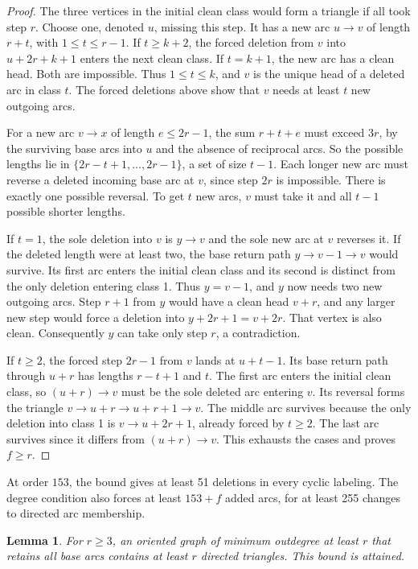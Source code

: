 \documentclass[10pt]{article}
\newtheorem{lemma}[theorem]{Lemma}
\begin{document}
\begin{proof}
The three vertices in the initial clean class would form a triangle
if all took step \(r\). Choose one, denoted \(u\), missing this step.
It has a new arc \(u\to v\) of length \(r+t\), with \(1\le t\le r-1\).
If \(t\ge k+2\), the forced deletion from \(v\) into \(u+2r+k+1\)
enters the next clean class. If \(t=k+1\), the new arc has a clean
head. Both are impossible. Thus \(1\le t\le k\), and \(v\) is the
unique head of a deleted arc in class \(t\). The forced deletions
above show that \(v\) needs at least \(t\) new outgoing arcs.

For a new arc \(v\to x\) of length \(e\le2r-1\), the sum \(r+t+e\)
must exceed \(3r\), by the surviving base arcs into \(u\) and the
absence of reciprocal arcs. So the possible lengths lie in
\(\{2r-t+1,\ldots,2r-1\}\), a set of size \(t-1\).
Each longer new arc must reverse a deleted incoming base arc at \(v\),
since step \(2r\) is impossible. There is exactly one possible
reversal. To get \(t\) new arcs, \(v\) must take it and all \(t-1\)
possible shorter lengths.

If \(t=1\), the sole deletion into \(v\) is \(y\to v\) and the sole new
arc at \(v\) reverses it. If the deleted length were at least two,
the base return path \(y\to v-1\to v\) would survive. Its first arc
enters the initial clean class and its second is distinct from the
only deletion entering class 1. Thus \(y=v-1\), and \(y\) now needs
two new outgoing arcs. Step \(r+1\) from \(y\) would have a clean
head \(v+r\), and any larger new step would force a deletion into
\(y+2r+1=v+2r\). That vertex is also clean. Consequently \(y\) can
take only step \(r\), a contradiction.

If \(t\ge2\), the forced step \(2r-1\) from \(v\) lands at \(u+t-1\).
Its base return path through \(u+r\) has lengths \(r-t+1\) and \(t\).
The first arc enters the initial clean class, so \((u+r)\to v\)
must be the sole deleted arc entering \(v\). Its reversal forms the
triangle \(v\to u+r\to u+r+1\to v\). The middle arc survives because
the only deletion into class 1 is \(v\to u+2r+1\), already forced by
\(t\ge2\). The last arc survives since it differs from \((u+r)\to v\).
This exhausts the cases and proves \(f\ge r\).
\end{proof}

At order \(153\), the bound gives at least 51 deletions in every cyclic
labeling. The degree condition also forces at least \(153+f\) added
arcs, for at least 255 changes to directed arc membership.

\begin{lemma}
For \(r\ge3\), an oriented graph of minimum outdegree at least \(r\)
that retains all base arcs contains at least \(r\) directed triangles.
This bound is attained.
\end{lemma}
\end{document}
